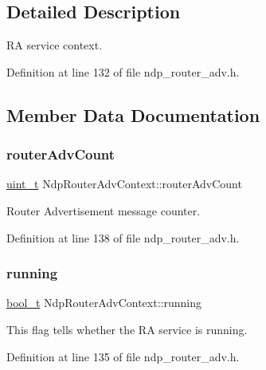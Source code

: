 \subsection{Detailed Description}
RA service context. 

Definition at line 132 of file ndp\+\_\+router\+\_\+adv.\+h.



\subsection{Member Data Documentation}
\mbox{\label{structNdpRouterAdvContext_a60ba076474e519acc836ce7ad891ddf8}} 
\subsubsection{\texorpdfstring{router\+Adv\+Count}{routerAdvCount}}
{\footnotesize\ttfamily \hyperlink{compiler__port_8h_a12a1e9b3ce141648783a82445d02b58d}{uint\+\_\+t} Ndp\+Router\+Adv\+Context\+::router\+Adv\+Count}



Router Advertisement message counter. 



Definition at line 138 of file ndp\+\_\+router\+\_\+adv.\+h.

\mbox{\label{structNdpRouterAdvContext_a256316b87afc01c4cdc02edb941c7284}} 
\subsubsection{\texorpdfstring{running}{running}}
{\footnotesize\ttfamily \hyperlink{compiler__port_8h_a812d16e5494522586b3784e55d479912}{bool\+\_\+t} Ndp\+Router\+Adv\+Context\+::running}



This flag tells whether the RA service is running. 



Definition at line 135 of file ndp\+\_\+router\+\_\+adv.\+h.

